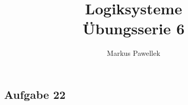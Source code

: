 

\title{Logiksysteme \\ Übungsserie 6}
\author{Markus Pawellek}
\newcommand{\email}{markuspawellek@gmail.com}

\usepackage{multicol}
\usepackage{turnstile}
\usepackage{sty/uniinput}

\usepackage {tikz}
\usetikzlibrary {positioning}
\usetikzlibrary{arrows.meta}



	\articletitle

  \begin{multicols}{2}

    \newcommand{\kripke}{\sdtstile{\m{K}}{}{}}
    \newcommand{\lbox}{\Box}
    \newcommand{\ldiamond}{\Diamond}
    \newcommand{\ctrue}{\text{wahr}}

    \newenvironment{graph}{
      \begin{center}
      \begin{tikzpicture}
      [
        -latex, auto,
        node distance =0.1\textwidth and 0.1\textwidth,
        on grid, semithick,
        state/.style = {
          circle,
          top color = white,
          bottom color = processblue!10,
          draw,
          processblue,
          text=black,
          minimum width = 0.7 cm,
        },
        >=Stealth
      ]
    }{
      \end{tikzpicture}
      \end{center}
    }


    \section*{Aufgabe 22} %
    \label{sec:aufgabe_22}


\end{multicols}
